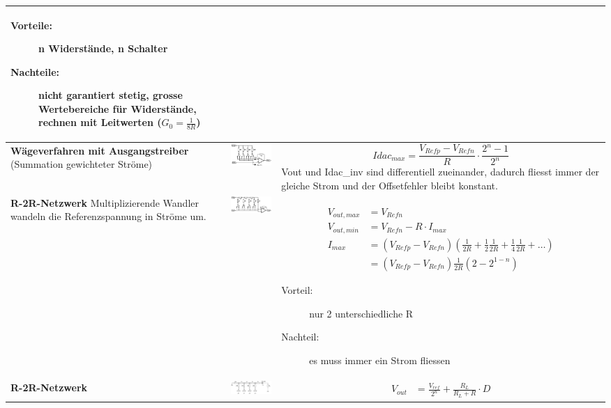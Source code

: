 \begin{longtable}{|p{3cm}|c|p{8.6cm}|}
	  \begin{description}
  		\item[Vorteile:] n Widerstände, n Schalter
  		\item[Nachteile:] nicht garantiert stetig, grosse Wertebereiche für Widerstände, rechnen mit Leitwerten ($G_0 = \frac{1}{8R}$)
	  \end{description}
	\\ \hline
	\textbf{Wägeverfahren mit Ausgangstreiber} \newline
  (Summation gewichteter Ströme)
	& \includegraphics[width=5cm, valign=t]{./pictures/praktisch.png}
	& \[ Idac_{max}=\frac{V_{Refp}-V_{Refn}}{R} \cdot \frac{2^n-1}{2^n} \] \newline
    Vout und Idac\_inv sind differentiell zueinander, dadurch fliesst immer der gleiche Strom
    und der Offsetfehler bleibt konstant.
	\\ \hline
	\textbf{R-2R-Netzwerk \hartl{462}} Multiplizierende Wandler wandeln die Referenzspannung in Ströme um.
	& \includegraphics[width=5.5cm, valign=t]{./pictures/r2rnetzwerk.png}
	& {
	\begin{align*}
		V_{out,max} &= V_{Refn} \\
		V_{out,min} &= V_{Refn} - R \cdot I_{max}\\
		I_{max}		&= (V_{Refp} - V_{Refn}) (\frac{1}{2R} + \frac{1}{2}\frac{1}{2R} + \frac{1}{4} \frac{1}{2R} + \ldots) \\
					&= (V_{Refp} - V_{Refn})\frac{1}{2R}(2-2^{1-n})
	\end{align*}}
  
  \begin{description}
    \item[Vorteil:] nur 2 unterschiedliche R
    \item[Nachteil:] es muss immer ein Strom fliessen
  \end{description}
  
	\\ \hline
	\textbf{R-2R-Netzwerk}
	& \includegraphics[width=5cm, valign=t]{pictures/r2r.png}
	& {
	\begin{align*}
		V_{out}&= \frac{V_{ref}}{2^n} + \frac{R_L}{R_L + R} \cdot D
	\end{align*}}
  

\end{longtable}
